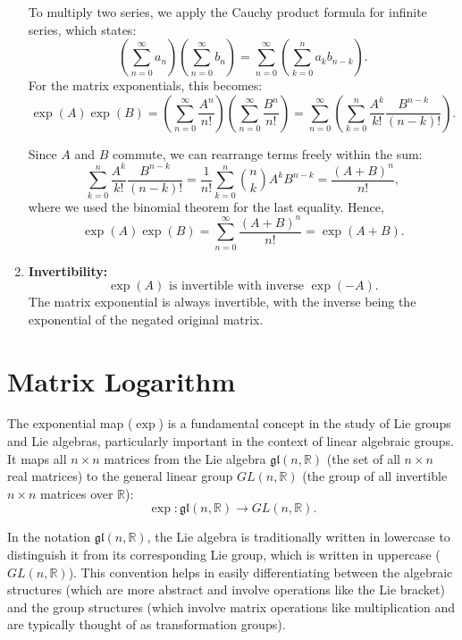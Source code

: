 \documentclass{article}
\begin{document}
\begin{enumerate}
To multiply two series, we apply the Cauchy product formula for infinite series, which states:
\[
\left(\sum_{n=0}^\infty a_n\right)\left(\sum_{n=0}^\infty b_n\right) = \sum_{n=0}^\infty \left(\sum_{k=0}^n a_k b_{n-k}\right).
\]
For the matrix exponentials, this becomes:
\[
\exp(A) \exp(B) = \left(\sum_{n=0}^\infty \frac{A^n}{n!}\right)\left(\sum_{n=0}^\infty \frac{B^n}{n!}\right) = \sum_{n=0}^\infty \left(\sum_{k=0}^n \frac{A^k}{k!} \frac{B^{n-k}}{(n-k)!}\right).
\]

Since \(A\) and \(B\) commute, we can rearrange terms freely within the sum:
\[
\sum_{k=0}^n \frac{A^k}{k!} \frac{B^{n-k}}{(n-k)!} = \frac{1}{n!} \sum_{k=0}^n \binom{n}{k} A^k B^{n-k} = \frac{(A+B)^n}{n!},
\]
where we used the binomial theorem for the last equality. Hence,
\[
\exp(A) \exp(B) = \sum_{n=0}^\infty \frac{(A+B)^n}{n!} = \exp(A+B).
\]

   \item \textbf{Invertibility:}
    \[
    \exp(A) \text{ is invertible with inverse } \exp(-A).
    \]
    The matrix exponential is always invertible, with the inverse being the exponential of the negated original matrix. 

\end{enumerate}

\section{Matrix Logarithm}

The exponential map (\(\exp\)) is a fundamental concept in the study of Lie groups and Lie algebras, particularly important in the context of linear algebraic groups. It maps all \(n \times n\) matrices from the Lie algebra \(\mathfrak{gl}(n, \mathbb{R})\) (the set of all \(n \times n\) real matrices) to the general linear group \(GL(n, \mathbb{R})\) (the group of all invertible \(n \times n\) matrices over \(\mathbb{R}\)):
\[
\exp: \mathfrak{gl}(n, \mathbb{R}) \to GL(n, \mathbb{R}).
\] 

In the notation \(\mathfrak{gl}(n, \mathbb{R})\), the Lie algebra is traditionally written in lowercase to distinguish it from its corresponding Lie group, which is written in uppercase (\(GL(n, \mathbb{R})\)). This convention helps in easily differentiating between the algebraic structures (which are more abstract and involve operations like the Lie bracket) and the group structures (which involve matrix operations like multiplication and are typically thought of as transformation groups).
\end{document}
